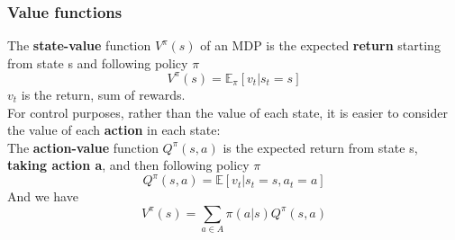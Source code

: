 \subsubsection{Value functions}
    The \textbf{state-value} function $V^{\pi}(s)$ of an MDP is the expected \textbf{return} starting from state s and following policy $\pi$
    $$V^{\pi}(s)=\mathbb{E}_{\pi}[v_t|s_t=s]$$
    $v_t$ is the return, sum of rewards.\\
    For control purposes, rather than the value of each state, it is easier to consider the value of each \textbf{action} in each state:\\
    The \textbf{action-value} function $Q^{\pi}(s,a)$ is the expected return from state s, \textbf{taking action a}, and then following policy $\pi$
    $$Q^{\pi}(s,a)=\mathbb{E}[v_t|s_t=s,a_t=a]$$
    And we have
    $$V^\pi(s)=\sum_{a \in A}\pi(a|s)Q^\pi(s,a)$$
